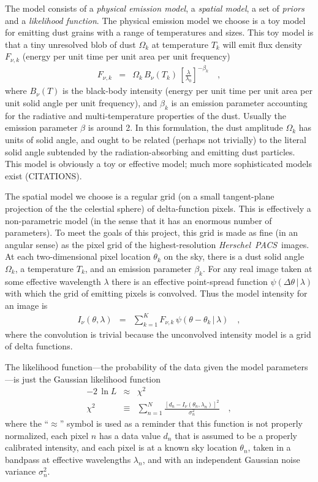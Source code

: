 \documentclass[12pt,pdftex,preprint]{aastex}
\newcommand{\project}[1]{\textsl{#1}}
\newcommand{\Herschel}{\project{Herschel}}
\newcommand{\PACS}{\project{PACS}}
\newcommand{\given}{\,|\,}
\begin{document}
The model consists of a \emph{physical emission model}, a
\emph{spatial model}, a set of \emph{priors} and a \emph{likelihood
  function}.  The physical emission model we choose is a toy model for
emitting dust grains with a range of temperatures and sizes.  This toy
model is that a tiny unresolved blob of dust $\Omega_k$ at temperature
$T_k$ will emit flux density $F_{\nu,k}$ (energy per unit time per
unit area per unit frequency)
\begin{eqnarray}\displaystyle
F_{\nu,k} &=& \Omega_k\,B_{\nu}(T_k)\,\left[\frac{\lambda}{\lambda_0}\right]^{-\beta_k}
\quad,
\end{eqnarray}
where $B_{\nu}(T)$ is the black-body intensity (energy per unit time
per unit area per unit solid angle per unit frequency), and $\beta_k$
is an emission parameter accounting for the radiative and
multi-temperature properties of the dust.  Usually the emission
parameter $\beta$ is around 2.  In this formulation, the dust
amplitude $\Omega_k$ has units of solid angle, and ought to be related
(perhaps not trivially) to the literal solid angle subtended by the
radiation-absorbing and emitting dust particles.  This model is
obviously a toy or effective model; much more sophisticated models
exist (CITATIONS).

The spatial model we choose is a regular grid (on a small
tangent-plane projection of the the celestial sphere) of
delta-function pixels.  This is effectively a non-parametric model (in
the sense that it has an enormous number of parameters).  To meet the
goals of this project, this grid is made as fine (in an angular sense)
as the pixel grid of the highest-resolution \Herschel\ \PACS\ images.
At each two-dimensional pixel location $\theta_k$ on the sky, there is
a dust solid angle $\Omega_k$, a temperature $T_k$, and an emission
parameter $\beta_k$.  For any real image taken at some effective
wavelength $\lambda$ there is an effective point-spread function
$\psi(\Delta\theta\given\lambda)$ with which the grid of emitting
pixels is convolved.  Thus the model intensity for an image is
\begin{eqnarray}\displaystyle
I_{\nu}(\theta,\lambda) &=& \sum_{k=1}^{K}
F_{\nu,k}\,\psi(\theta-\theta_k\given\lambda) \quad ,
\end{eqnarray}
where the convolution is trivial because the unconvolved intensity
model is a grid of delta functions.

The likelihood function---the probability of the data given the model parameters---is just the Gaussian
likelihood function
\begin{eqnarray}\displaystyle
-2\,\ln L &\approx& \chi^2
\\
\chi^2 &\equiv& \sum_{n=1}^N \frac{\left[d_n - I_{\nu}(\theta_n,\lambda_n)\right]^2}{\sigma_n^2}
\quad,
\end{eqnarray}
where the ``$\approx$'' symbol is used as a reminder that this
function is not properly normalized, each pixel $n$ has a data value
$d_n$ that is assumed to be a properly calibrated intensity, and each
pixel is at a known sky location $\theta_n$, taken in a bandpass at
effective wavelengths $\lambda_n$, and with an independent Gaussian
noise variance $\sigma_n^2$.
\end{document}
